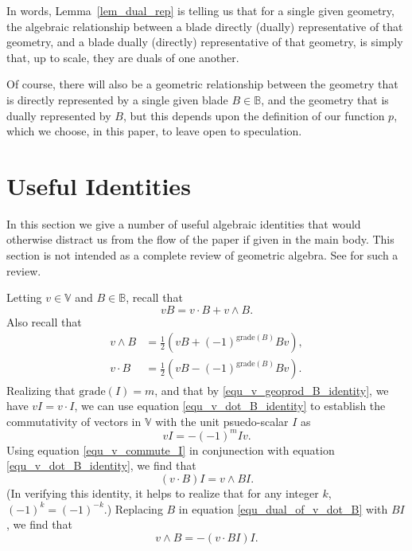 \documentclass{birkjour}
\theoremstyle{definition}
\theoremstyle{remark}
\numberwithin{equation}{section}
\newcommand{\B}{\mathbb{B}}
\newcommand{\V}{\mathbb{V}}
\newcommand{\grade}{\mbox{grade}}
\begin{document}
In words, Lemma~\ref{lem_dual_rep} is telling us that for a single given geometry, the algebraic relationship between a
blade directly (dually) representative of that geometry, and a blade dually (directly) representative of that geometry, is simply
that, up to scale, they are duals of one another.

Of course, there will also be a geometric relationship between the geometry that is directly represented by a single given
blade $B\in\B$, and the geometry that is dually represented by $B$, but this depends upon the definition of our function
$p$, which we choose, in this paper, to leave open to speculation.





\section{Useful Identities}\label{sec_useful_identities}

In this section we give a number of useful algebraic identities that would otherwise distract us from the flow of the
paper if given in the main body.  This section is not intended as a complete review of geometric algebra.
See \cite{} for such a review.

Letting $v\in\V$ and $B\in\B$, recall that
\begin{equation}\label{equ_v_geoprod_B_identity}
vB = v\cdot B+v\wedge B.
\end{equation}
Also recall that
\begin{align}
v\wedge B &= \frac{1}{2}(vB+(-1)^{\grade(B)}Bv),\label{equ_v_wedge_B_identity} \\
v\cdot B &= \frac{1}{2}(vB-(-1)^{\grade(B)}Bv).\label{equ_v_dot_B_identity}
\end{align}
Realizing that $\grade(I)=m$, and that by \eqref{equ_v_geoprod_B_identity}, we have $vI=v\cdot I$, we can use
equation \eqref{equ_v_dot_B_identity} to establish the commutativity of vectors in $\V$ with the unit psuedo-scalar $I$ as
\begin{equation}\label{equ_v_commute_I}
vI = -(-1)^mIv.
\end{equation}
Using equation \eqref{equ_v_commute_I} in conjunection with equation \eqref{equ_v_dot_B_identity}, we find that
\begin{equation}\label{equ_dual_of_v_dot_B}
(v\cdot B)I = v\wedge BI.
\end{equation}
(In verifying this identity, it helps to realize that for any integer $k$, $(-1)^k=(-1)^{-k}$.)
Replacing $B$ in equation \eqref{equ_dual_of_v_dot_B} with $BI$, we find that
\begin{equation}\label{equ_dual_of_v_dot_dual_B}
v\wedge B = -(v\cdot BI)I.
\end{equation}


\begin{thebibliography}{9}

\end{thebibliography}
\end{document}
